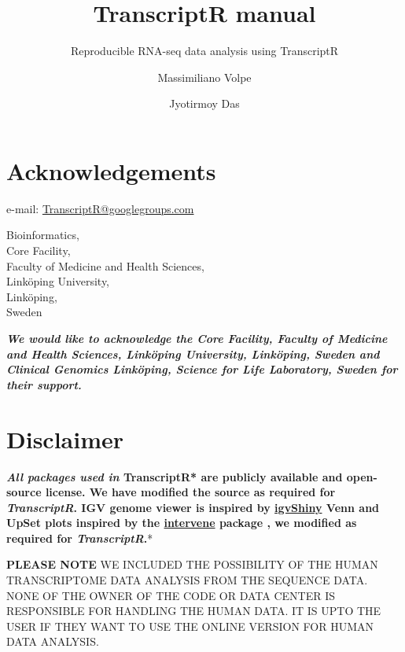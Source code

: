 \documentclass[
  a4paper,
  DIV=11,
  numbers=noendperiod,
  oneside,
  open=any]{scrreport}
\title{TranscriptR manual}
\subtitle{Reproducible RNA-seq data analysis using TranscriptR}
\author{Massimiliano Volpe \and Jyotirmoy Das}
\date{}
\renewcommand*\contentsname{Table of contents}
\newcommand\contentsname{Table of contents}
\begin{document}
\maketitle

\renewcommand*\contentsname{Contents}
{
\hypersetup{linkcolor=blue}
\setcounter{tocdepth}{1}
\tableofcontents
}
\listoffigures
{}

\chapter*{Acknowledgements}\label{acknowledgements}


e-mail: \url{TranscriptR@googlegroups.com}

Bioinformatics,\\
Core Facility,\\
Faculty of Medicine and Health Sciences,\\
Linköping University,\\
Linköping,\\
Sweden

\textbf{\emph{We would like to acknowledge the Core Facility, Faculty of
Medicine and Health Sciences, Linköping University, Linköping, Sweden
and Clinical Genomics Linköping, Science for Life Laboratory, Sweden for
their support.}}


\chapter*{Disclaimer}\label{disclaimer}


\textbf{\emph{All packages used in }TranscriptR* are publicly available
and open-source license. We have modified the source as required for
\emph{TranscriptR}. IGV genome viewer is inspired by
\href{https://github.com/gladkia/igvShiny}{igvShiny} Venn and UpSet
plots inspired by the
\href{https://github.com/asntech/intervene}{intervene} package
\autocite{khan2017intervene}, we modified as required for
\emph{TranscriptR}.}*

\begin{tcolorbox}[enhanced jigsaw, coltitle=black, colback=white, title=\textcolor{quarto-callout-important-color}{\faExclamation}\hspace{0.5em}{IMPORTANT}, leftrule=.75mm, titlerule=0mm, colframe=quarto-callout-important-color-frame, toprule=.15mm, opacityback=0, arc=.35mm, breakable, rightrule=.15mm, colbacktitle=quarto-callout-important-color!10!white, bottomtitle=1mm, opacitybacktitle=0.6, left=2mm, bottomrule=.15mm, toptitle=1mm]

\textbf{PLEASE NOTE} WE INCLUDED THE POSSIBILITY OF THE HUMAN
TRANSCRIPTOME DATA ANALYSIS FROM THE SEQUENCE DATA. NONE OF THE OWNER OF
THE CODE OR DATA CENTER IS RESPONSIBLE FOR HANDLING THE HUMAN DATA. IT
IS UPTO THE USER IF THEY WANT TO USE THE ONLINE VERSION FOR HUMAN DATA
ANALYSIS.

\end{tcolorbox}
\end{document}
